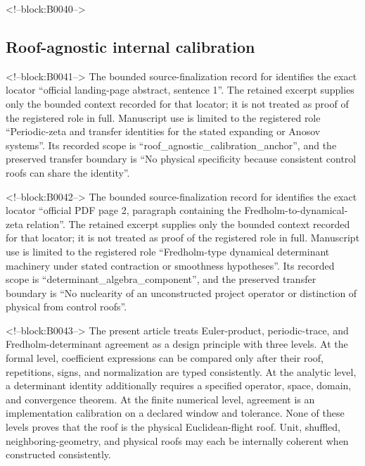 \documentclass[11pt,a4paper]{article}
\begin{document}
<!--block:B0040-->
\subsection{Roof-agnostic internal calibration}

<!--block:B0041-->
The bounded source-finalization record for \citep{P30-S13} identifies
the exact locator ``official landing-page abstract, sentence 1''.  The retained excerpt supplies only the
bounded context recorded for that locator; it is not treated as proof of the
registered role in full.  Manuscript use is limited to the registered role ``Periodic-zeta and transfer identities for the stated expanding or Anosov systems''.
Its recorded scope is ``roof\_agnostic\_calibration\_anchor'', and the preserved
transfer boundary is ``No physical specificity because consistent control roofs can share the identity''.

<!--block:B0042-->
The bounded source-finalization record for \citep{P30-S14} identifies
the exact locator ``official PDF page 2, paragraph containing the Fredholm-to-dynamical-zeta relation''.  The retained excerpt supplies only the
bounded context recorded for that locator; it is not treated as proof of the
registered role in full.  Manuscript use is limited to the registered role ``Fredholm-type dynamical determinant machinery under stated contraction or smoothness hypotheses''.
Its recorded scope is ``determinant\_algebra\_component'', and the preserved
transfer boundary is ``No nuclearity of an unconstructed project operator or distinction of physical from control roofs''.

<!--block:B0043-->
The present article treats Euler-product, periodic-trace, and Fredholm-determinant agreement as a design principle with three levels. At the formal level, coefficient expressions can be compared only after their roof, repetitions, signs, and normalization are typed consistently. At the analytic level, a determinant identity additionally requires a specified operator, space, domain, and convergence theorem. At the finite numerical level, agreement is an implementation calibration on a declared window and tolerance. None of these levels proves that the roof is the physical Euclidean-flight roof. Unit, shuffled, neighboring-geometry, and physical roofs may each be internally coherent when constructed consistently.
\end{document}
